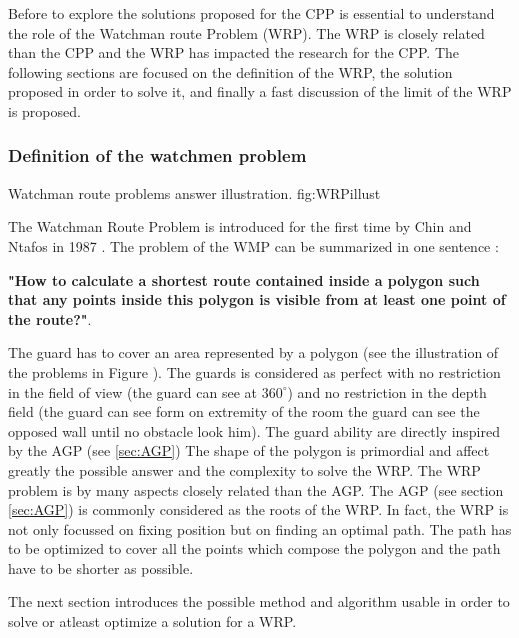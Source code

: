 Before to explore the solutions proposed for the CPP is essential to understand the role of the Watchman route Problem (WRP). The WRP is closely related than the CPP and the WRP has impacted the research for the CPP. 
The following sections are focused on the definition of the WRP, the solution proposed in order to solve it, and finally a fast discussion of the limit of the WRP  is proposed.
 
\subsubsection{Definition of the watchmen problem }

 \begin{mfigures}[!]
{Watchman route problems answer illustration. }{fig:WRPillust} \centering
{}
\hspace{1cm}
\end{mfigures}	
The Watchman Route Problem is introduced for the first time by Chin and Ntafos in 1987 \cite{54*chin1988}. The problem of the WMP can be summarized in one sentence :

\textbf{"How to calculate a shortest route contained inside a polygon such that any points inside this polygon is visible from at least one point of the route?"}.  

The guard has to cover an area represented by a polygon (see the illustration of the problems in Figure ). The guards is considered as perfect with no restriction in the field of view (the guard can see at $360^\circ$) and no restriction in the depth field (the guard can see form on extremity of the room the guard can see the opposed wall until no obstacle look him). The guard ability are directly inspired by the AGP (see \ref{sec:AGP})
The shape of the polygon is primordial and affect greatly the possible answer and the complexity to solve the WRP.
The WRP problem is by many aspects closely related than the AGP. The AGP (see  section \ref{sec:AGP}) is commonly considered as the roots of the WRP.
 In fact, the WRP is not only focussed on fixing position but on finding an optimal path. The path has to be optimized to cover all the points which compose the polygon  and the path have to be shorter as possible.
 
 The next section introduces the possible method and algorithm usable in order to solve or atleast optimize a solution for a WRP.
 


